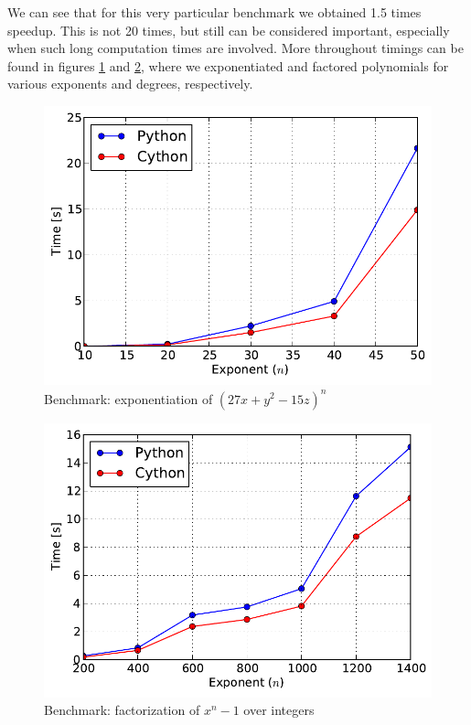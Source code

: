 We can see that for this very particular benchmark we obtained 1.5 times speedup. This is
not 20 times, but still can be considered important, especially when such long computation
times are involved. More throughout timings can be found in figures \ref{fig-cython-power}
and \ref{fig-cython-factor}, where we exponentiated and factored polynomials for various
exponents and degrees, respectively.
\begin{figure}[htbp]
\centering

\includegraphics{cython-power.pdf}
\caption{Benchmark: exponentiation of $(27 x + y^2 - 15 z)^n$\label{fig-cython-power}}\end{figure}
\begin{figure}[htbp]
\centering

\includegraphics{cython-factor.pdf}
\caption{Benchmark: factorization of $x^n - 1$ over integers\label{fig-cython-factor}}\end{figure}

